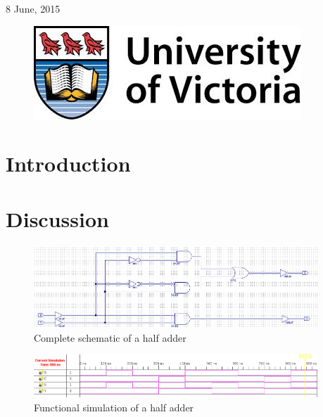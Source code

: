 \documentclass[11pt]{article}
\begin{document}
\begin{titlepage}
{\large 8 June, 2015}\\ %

\begin{figure}[b]	 %
	\centering
	\includegraphics[scale=0.3]{UVic_logo}
\end{figure}

\end{titlepage}


\section{Introduction}

\section{Discussion}
\begin{figure}[htbp]
	\centering
	\includegraphics[width=0.95\textwidth, draft=false]{ha_schematic}
	\caption{Complete schematic of a half adder}
	\label{fig:schematic}
\end{figure}

\begin{figure}[htbp]
	\centering
	\includegraphics[width=0.95\textwidth, draft=false]{functional_sim}
	\caption{Functional simulation of a half adder}
	\label{fig:functional_sim}
\end{figure}
\end{document}
